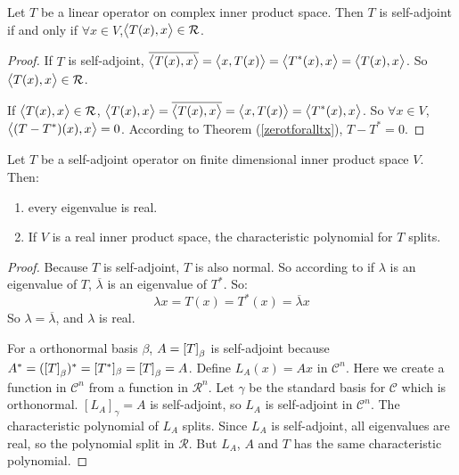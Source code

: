 \begin{theorem}
    Let $T$ be a linear operator on complex inner product space. Then $T$ is self-adjoint if and only if $\forall x \in V$,$\left\langle \displaystyle T(x), x \right\rangle \in \mathcal{R}$.
\end{theorem}
\begin{proof}
    If $T$ is self-adjoint, $\overline{\left\langle \displaystyle T(x), x \right\rangle} = \left\langle \displaystyle x, T(x) \right\rangle = \left\langle \displaystyle T^*(x), x \right\rangle = \left\langle \displaystyle T(x), x \right\rangle$. So $\left\langle \displaystyle T(x), x \right\rangle \in \mathcal{R}$.
    
    If $\left\langle \displaystyle T(x), x \right\rangle \in \mathcal{R}$, $\left\langle \displaystyle T(x), x \right\rangle = \overline{\left\langle \displaystyle T(x), x \right\rangle} = \left\langle \displaystyle x, T(x) \right\rangle = \left\langle \displaystyle T^*(x), x \right\rangle$. So $\forall x \in V$, $\left\langle \displaystyle (T - T^*)(x), x \right\rangle = 0$. According to Theorem (\ref{zerotforalltx}), $T - T^* = 0$.
\end{proof}


\begin{theorem}
    Let $T$ be a self-adjoint operator on finite dimensional inner product space $V$. Then:
    \begin{enumerate}
        \item every eigenvalue is real.
        \item If $V$ is a real inner product space, the characteristic polynomial for $T$ splits.
    \end{enumerate}
\end{theorem}
\begin{proof}
    Because $T$ is self-adjoint, $T$ is also normal. So according to  if $\lambda$ is an eigenvalue of $T$,  $\overline{\lambda}$ is an eigenvalue of $T^*$. So:
    \begin{equation*}
        \lambda x = T(x) = T^*(x) = \overline{\lambda} x
    \end{equation*}
    So $\lambda = \overline{\lambda}$, and $\lambda$ is real.
    
    For a orthonormal basis $\beta$, $A = \coordinate{T}_\beta$ is self-adjoint because $A^* = (\coordinate{T}_\beta)^* = [T^*]_\beta = \coordinate{T}_\beta = A$. Define $L_A(x) = Ax$ in $\mathcal{C}^n$. Here we create a function in $\mathcal{C}^n$ from a function in $\mathcal{R}^n$. Let $\gamma$ be the standard basis for $\mathcal{C}$ which is orthonormal. $[L_A]_\gamma = A$ is self-adjoint, so $L_A$ is self-adjoint in $\mathcal{C}^n$. The characteristic polynomial of $L_A$ splits. Since $L_A$ is self-adjoint, all eigenvalues are real, so the polynomial split in $\mathcal{R}$. But $L_A$, $A$ and $T$ has the same characteristic polynomial.
\end{proof}

